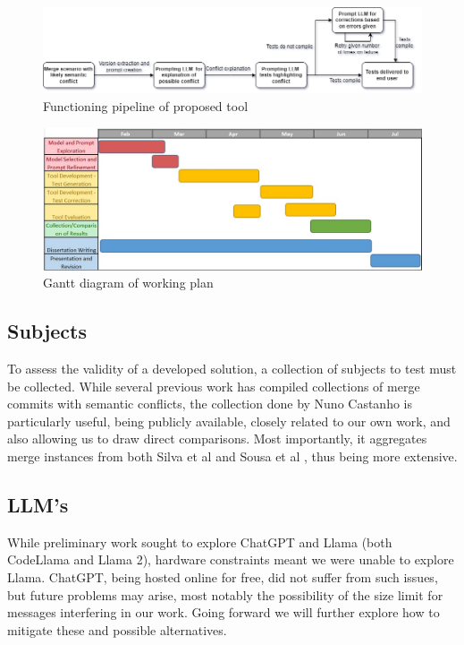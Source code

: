 \begin{figure}
    \centering
    \includegraphics[width=1\linewidth]{figures/tool.png}
    \caption{Functioning pipeline of proposed tool}
    \label{fig:tool}
\end{figure}

\begin{figure}
    \centering
    \includegraphics[width=1\linewidth]{figures/gantt.jpg}
    \caption{Gantt diagram of working plan}
    \label{fig:gantt}
\end{figure}

\subsection{Subjects}

To assess the validity of a developed solution, a collection of subjects to test must be collected. While several previous work has compiled collections of merge commits with semantic conflicts, the collection done by Nuno Castanho \cite{kn:nuno} is particularly useful, being publicly available, closely related to our own work, and also allowing us to draw direct comparisons. Most importantly, it aggregates merge instances from both Silva et al \cite{kn:leuson} and Sousa et al \cite{kn:safemerge}, thus being more extensive.

\subsection{LLM's}

While preliminary work sought to explore ChatGPT and Llama (both CodeLlama and Llama 2), hardware constraints meant we were unable to explore Llama. ChatGPT, being hosted online for free, did not suffer from such issues, but future problems may arise, most notably the possibility of the size limit for messages interfering in our work. Going forward we will further explore how to mitigate these and possible alternatives.